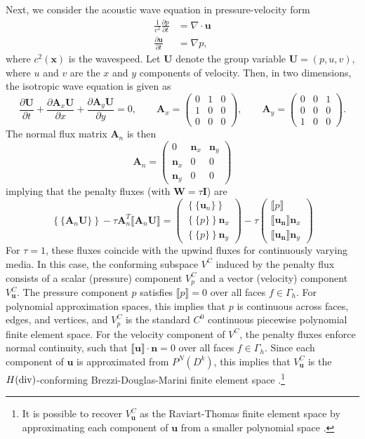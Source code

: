 \documentclass[10pt]{article}
\newcommand{\pd}[2]{\frac{\partial#1}{\partial#2}}
\newcommand{\LRc}[1]{\left\{ #1 \right\}}
\newcommand{\Grad} {\ensuremath{\nabla}}
\newcommand{\Div} {\ensuremath{\nabla\cdot}}
\newcommand{\jump}[1] {\ensuremath{\llbracket#1\rrbracket}}
\newcommand{\avg}[1] {\ensuremath{\LRc{\!\{#1\}\!}}}
\newcommand{\Gh}{\Gamma_h}
\begin{document}
Next, we consider the acoustic wave equation in pressure-velocity form
\begin{align*}
\frac{1}{c^2}\pd{p}{t} &= \Div \bm{u}\\
\pd{\bm{u}}{t} &= \Grad p,
\end{align*}
where $c^2(\bm{x})$ is the wavespeed.  Let $\bm{U}$ denote the group variable $\bm{U} = (p,u,v)$, where $u$ and $v$ are the $x$ and $y$ components of velocity.  Then, in two dimensions, the isotropic wave equation is given as
\[
\pd{\bm{U}}{t} + \pd{\bm{A}_x\bm{U}}{x} + \pd{\bm{A}_y\bm{U}}{y} = 0, \qquad \bm{A}_x = 
\left(\begin{array}{ccc}
0 & 1 & 0\\
1 & 0 & 0\\
0 & 0 & 0
\end{array}
\right), \qquad 
\bm{A}_y = 
\left(\begin{array}{ccc}
0 & 0 & 1\\
0 & 0 & 0\\
1 & 0 & 0
\end{array}
\right).
\]
The normal flux matrix $\bm{A}_n$ is then
\[
\bm{A}_n = 
\left(\begin{array}{ccc}
0 & \bm{n}_x & \bm{n}_y\\
\bm{n}_x & 0 & 0\\
\bm{n}_y & 0 & 0
\end{array}
\right)
\]
implying that the penalty fluxes (with $\bm{W} = \tau\bm{I}$) are 
\[
\avg{\bm{A}_n \bm{U}} - \tau\bm{A}_n^T \jump{\bm{A}_n\bm{U}} = \left(\begin{array}{c}
\avg{\bm{u}_n}\\
\avg{p }\bm{n}_x\\
\avg{p }\bm{n}_y
\end{array}
\right) - 
\tau\left(\begin{array}{c}
\jump{p}\\
\jump{\bm{u_n}}\bm{n}_x\\
\jump{\bm{u_n}}\bm{n}_y
\end{array}
\right)
\]
For $\tau = 1$, these fluxes coincide with the upwind fluxes for continuously varying media.  In this case, the conforming subspace $V^{C}$ induced by the penalty flux consists of a scalar (pressure) component $V^C_p$ and a vector (velocity) component $V^C_{\bm{u}}$.  The pressure component $p$ satisfies $\jump{p} = 0$ over all faces $f\in \Gh$.  For polynomial approximation spaces, this implies that $p$ is continuous across faces, edges, and vertices, and $V^C_p$ is the standard $C^0$ continuous piecewise polynomial finite element space.  For the velocity component of $V^C$, the penalty fluxes enforce normal continuity, such that $\jump{\bm{u}}\cdot \bm{n} = 0$ over all faces $f \in \Gh$.  Since each component of $\bm{u}$ is approximated from $P^N(D^k)$, this implies that $V^C_{\bm{u}}$ is the $H({\rm div})$-conforming Brezzi-Douglas-Marini finite element space \cite{brezzi1985two,boffi2013mixed}.\footnote{It is possible to recover $V^C_{\bm{u}}$ as the Raviart-Thomas finite element space by approximating each component of $\bm{u}$ from a smaller polynomial space \cite{kirby2004algorithm}.}  
\end{document}
